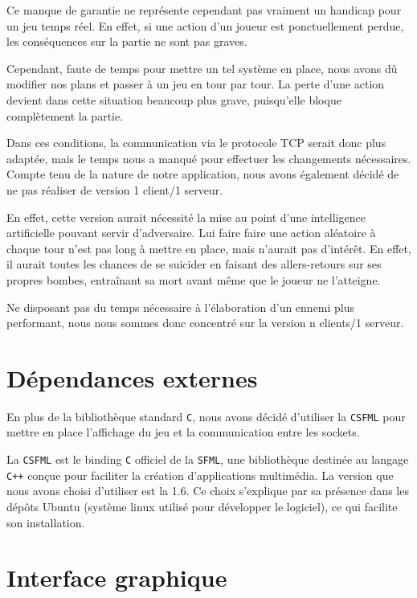 Ce manque de garantie ne représente cependant pas vraiment un handicap pour un jeu temps réel. En effet, si une action d'un joueur est ponctuellement perdue, les conséquences sur la partie ne sont pas graves.

Cependant, faute de temps pour mettre un tel système en place, nous avons dû modifier nos plans et passer à un jeu en tour par tour. La perte d'une action devient dans cette situation beaucoup plus grave, puisqu'elle bloque complètement la partie.

Dans ces conditions, la communication via le protocole TCP serait donc plus adaptée, mais le temps nous a manqué pour effectuer les changements nécessaires.\\

Compte tenu de la nature de notre application, nous avons également décidé de ne pas réaliser de version 1 client/1 serveur.

En effet, cette version aurait nécessité la mise au point d'une intelligence artificielle pouvant servir d'adversaire. Lui faire faire une action aléatoire à chaque tour n'est pas long à mettre en place, mais n'aurait pas d'intérêt. En effet, il aurait toutes les chances de se suicider en faisant des allers-retours sur ses propres bombes, entraînant sa mort avant même que le joueur ne l'atteigne.

Ne disposant pas du temps nécessaire à l'élaboration d'un ennemi plus performant, nous nous sommes donc concentré sur la version n clients/1 serveur.

\section*{Dépendances externes}

En plus de la bibliothèque standard \texttt{C}, nous avons décidé d'utiliser la \texttt{CSFML} pour mettre en place l'affichage du jeu et la communication entre les sockets.

La \texttt{CSFML} est le binding \texttt{C} officiel de la \texttt{SFML}, une bibliothèque destinée au langage \texttt{C++} conçue pour faciliter la création d'applications multimédia. La version que nous avons choisi d'utiliser est la 1.6. Ce choix s'explique par sa présence dans les dépôts Ubuntu (système linux utilisé pour développer le logiciel), ce qui facilite son installation.

\section*{Interface graphique}

